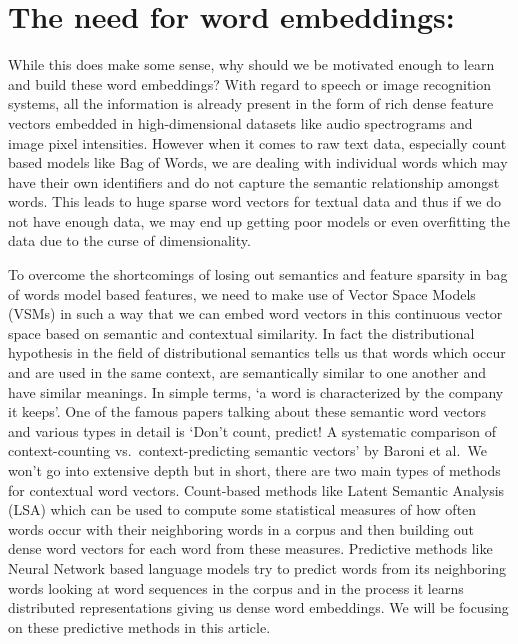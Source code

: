 \documentclass[11pt]{article}
\begin{document}
\hypertarget{the-need-for-word-embeddings}{%
\section{The need for word
embeddings:}\label{the-need-for-word-embeddings}}

While this does make some sense, why should we be motivated enough to
learn and build these word embeddings? With regard to speech or image
recognition systems, all the information is already present in the form
of rich dense feature vectors embedded in high-dimensional datasets like
audio spectrograms and image pixel intensities. However when it comes to
raw text data, especially count based models like Bag of Words, we are
dealing with individual words which may have their own identifiers and
do not capture the semantic relationship amongst words. This leads to
huge sparse word vectors for textual data and thus if we do not have
enough data, we may end up getting poor models or even overfitting the
data due to the curse of dimensionality.

To overcome the shortcomings of losing out semantics and feature
sparsity in bag of words model based features, we need to make use of
Vector Space Models (VSMs) in such a way that we can embed word vectors
in this continuous vector space based on semantic and contextual
similarity. In fact the distributional hypothesis in the field of
distributional semantics tells us that words which occur and are used in
the same context, are semantically similar to one another and have
similar meanings. In simple terms, `a word is characterized by the
company it keeps'. One of the famous papers talking about these semantic
word vectors and various types in detail is `Don't count, predict! A
systematic comparison of context-counting vs.~context-predicting
semantic vectors' by Baroni et al.~We won't go into extensive depth but
in short, there are two main types of methods for contextual word
vectors. Count-based methods like Latent Semantic Analysis (LSA) which
can be used to compute some statistical measures of how often words
occur with their neighboring words in a corpus and then building out
dense word vectors for each word from these measures. Predictive methods
like Neural Network based language models try to predict words from its
neighboring words looking at word sequences in the corpus and in the
process it learns distributed representations giving us dense word
embeddings. We will be focusing on these predictive methods in this
article.


    
    
    
    
\end{document}
